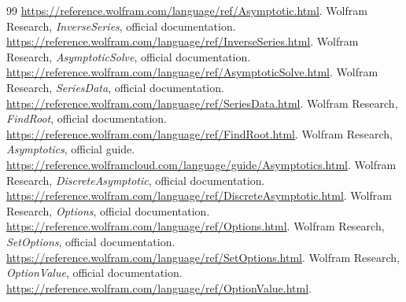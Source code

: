 \documentclass[11pt,letterpaper]{article}
\begin{document}
\begin{thebibliography}{99}
\url{https://reference.wolfram.com/language/ref/Asymptotic.html}.
 Wolfram Research, \emph{InverseSeries}, official documentation.
\url{https://reference.wolfram.com/language/ref/InverseSeries.html}.
 Wolfram Research, \emph{AsymptoticSolve}, official documentation.
\url{https://reference.wolfram.com/language/ref/AsymptoticSolve.html}.
 Wolfram Research, \emph{SeriesData}, official documentation.
\url{https://reference.wolfram.com/language/ref/SeriesData.html}.
 Wolfram Research, \emph{FindRoot}, official documentation.
\url{https://reference.wolfram.com/language/ref/FindRoot.html}.
 Wolfram Research, \emph{Asymptotics}, official guide.
\url{https://reference.wolframcloud.com/language/guide/Asymptotics.html}.
 Wolfram Research, \emph{DiscreteAsymptotic}, official documentation.
\url{https://reference.wolfram.com/language/ref/DiscreteAsymptotic.html}.
 Wolfram Research, \emph{Options}, official documentation.
\url{https://reference.wolfram.com/language/ref/Options.html}.
 Wolfram Research, \emph{SetOptions}, official documentation.
\url{https://reference.wolfram.com/language/ref/SetOptions.html}.
 Wolfram Research, \emph{OptionValue}, official documentation.
\url{https://reference.wolfram.com/language/ref/OptionValue.html}.
\end{thebibliography}
\end{document}
